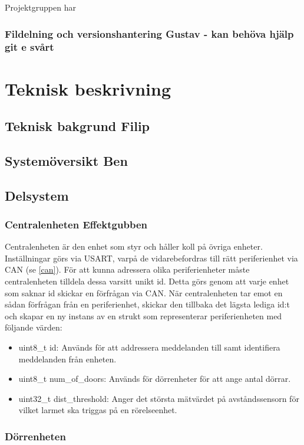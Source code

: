 \documentclass{article}
\begin{document}
Projektgruppen har 
\subsubsection{Fildelning och versionshantering Gustav - kan behöva hjälp git e svårt}


\section{Teknisk beskrivning} %
\subsection{Teknisk bakgrund Filip}
\subsection{Systemöversikt Ben}
\subsection{Delsystem }
\subsubsection{Centralenheten Effektgubben}
Centralenheten är den enhet som styr och håller koll på övriga enheter. Inställningar görs via USART, varpå de vidarebefordras till rätt periferienhet via CAN (se \ref{can}). För att kunna adressera olika periferienheter måste centralenheten tilldela dessa varsitt unikt id. Detta görs genom att varje enhet som saknar id skickar en förfrågan via CAN. När centralenheten tar emot en sådan förfrågan från en periferienhet, skickar den tillbaka det lägsta lediga id:t och skapar en ny instans av en strukt som representerar periferienheten med följande värden:
\begin{itemize}
    \item uint8\_t id: Används för att addressera meddelanden till samt identifiera meddelanden från enheten.
    \item uint8\_t num\_of\_doors: Används för dörrenheter för att ange antal dörrar.
    \item uint32\_t dist\_threshold: Anger det största mätvärdet på avståndssensorn för vilket larmet ska triggas på en rörelseenhet.
\end{itemize}
\subsubsection{Dörrenheten}
\end{document}

